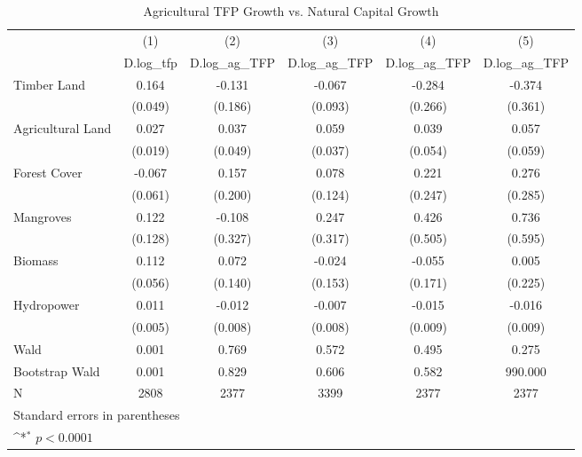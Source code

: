 \begin{table}[htbp]\centering
\def\sym#1{\ifmmode^{#1}\else\(^{#1}\)\fi}
\caption{Agricultural TFP Growth vs. Natural Capital Growth}
\begin{tabular}{l*{5}{c}}
\hline\hline
            &\multicolumn{1}{c}{(1)}&\multicolumn{1}{c}{(2)}&\multicolumn{1}{c}{(3)}&\multicolumn{1}{c}{(4)}&\multicolumn{1}{c}{(5)}\\
            &\multicolumn{1}{c}{D.log\_tfp}&\multicolumn{1}{c}{D.log\_ag\_TFP}&\multicolumn{1}{c}{D.log\_ag\_TFP}&\multicolumn{1}{c}{D.log\_ag\_TFP}&\multicolumn{1}{c}{D.log\_ag\_TFP}\\
\hline
Timber Land &       0.164       &      -0.131       &      -0.067       &      -0.284       &      -0.374       \\
            &     (0.049)       &     (0.186)       &     (0.093)       &     (0.266)       &     (0.361)       \\
[1em]
Agricultural Land &       0.027       &       0.037       &       0.059       &       0.039       &       0.057       \\
            &     (0.019)       &     (0.049)       &     (0.037)       &     (0.054)       &     (0.059)       \\
[1em]
Forest Cover &      -0.067       &       0.157       &       0.078       &       0.221       &       0.276       \\
            &     (0.061)       &     (0.200)       &     (0.124)       &     (0.247)       &     (0.285)       \\
[1em]
Mangroves &       0.122       &      -0.108       &       0.247       &       0.426       &       0.736       \\
            &     (0.128)       &     (0.327)       &     (0.317)       &     (0.505)       &     (0.595)       \\
[1em]
Biomass &       0.112       &       0.072       &      -0.024       &      -0.055       &       0.005       \\
            &     (0.056)       &     (0.140)       &     (0.153)       &     (0.171)       &     (0.225)       \\
[1em]
Hydropower &       0.011       &      -0.012       &      -0.007       &      -0.015       &      -0.016       \\
            &     (0.005)       &     (0.008)       &     (0.008)       &     (0.009)       &     (0.009)       \\
\hline
Wald        &       0.001       &       0.769       &       0.572       &       0.495       &       0.275       \\
Bootstrap Wald&       0.001       &       0.829       &       0.606       &       0.582       &     990.000       \\
N           &        2808       &        2377       &        3399       &        2377       &        2377       \\
\hline\hline
\multicolumn{6}{l}{\footnotesize Standard errors in parentheses}\\
\multicolumn{6}{l}{\footnotesize \sym{*} \(p<0.0001\)}\\
\end{tabular}
\end{table}
